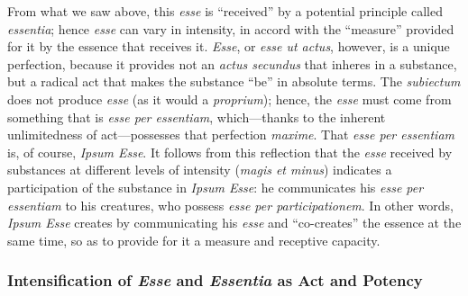 From what we saw above, this \emph{esse} is “received” by a potential principle called \emph{essentia}; hence \emph{esse} can vary in intensity, in accord with the “measure” provided for it by the essence that receives it. \emph{Esse}, or \emph{esse ut actus}, however, is a unique perfection, because it provides not an \emph{actus secundus} that inheres in a substance, but a radical act that makes the substance “be” in absolute terms. The \emph{subiectum} does not produce \emph{esse} (as it would a \emph{proprium}); hence, the \emph{esse} must come from something that is \emph{esse per essentiam}, which—thanks to the inherent unlimitedness of act—possesses that perfection \emph{maxime}. That \emph{esse per essentiam} is, of course, \emph{Ipsum Esse}. It follows from this reflection that the \emph{esse} received by substances at different levels of intensity (\emph{magis et minus}) indicates a participation of the substance in \emph{Ipsum Esse}: he communicates his \emph{esse per essentiam} to his creatures, who possess \emph{esse per participationem}. In other words, \emph{Ipsum Esse} creates by communicating his \emph{esse} and “co-creates” the essence at the same time, so as to provide for it a measure and receptive capacity.

\subsubsection{Intensification of \emph{Esse} and \emph{Essentia} as Act and Potency}
\label{intensification}

